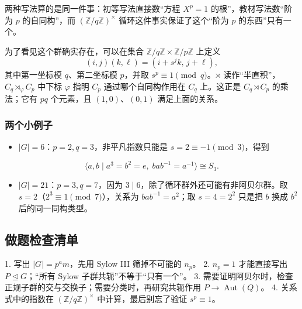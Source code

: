 两种写法算的是同一件事：初等写法直接数“方程 $X^p=1$ 的根”，教材写法数“阶为 $p$ 的自同构”，而 $(\mathbb Z/q\mathbb Z)^\times$ 循环这件事实保证了这个“阶为 $p$ 的东西”只有一个。

为了看见这个群确实存在，可以在集合 $\mathbb Z/q\mathbb Z\times\mathbb Z/p\mathbb Z$ 上定义
\[
(i,j)(k,\ell)=(i+s^j k,\,j+\ell),
\]
其中第一坐标模 $q$、第二坐标模 $p$，并取 $s^p\equiv1\pmod q$。$\rtimes$ 读作“半直积”，$C_q\rtimes_\varphi C_p$ 中下标 $\varphi$ 指明 $C_p$ 通过哪个自同构作用在 $C_q$ 上。这正是 $C_q\rtimes C_p$ 的乘法；它有 $pq$ 个元素，且 $(1,0)$、$(0,1)$ 满足上面的关系。

\subsubsection{两个小例子}


\begin{itemize}
\item $|G|=6$：$p=2,q=3$，非平凡指数只能是 $s=2\equiv-1\pmod3$，得到
\end{itemize}

\[
  \langle a,b\mid a^3=b^2=e,\;bab^{-1}=a^{-1}\rangle\cong S_3.
\]
\begin{itemize}
\item $|G|=21$：$p=3,q=7$，因为 $3\mid6$，除了循环群外还可能有非阿贝尔群。取 $s=2$（$2^3\equiv1\pmod7$），关系为 $bab^{-1}=a^2$；取 $s=4=2^2$ 只是把 $b$ 换成 $b^2$ 后的同一同构类型。
\end{itemize}


\subsection{做题检查清单}


1. 写出 $|G|=p^a m$，先用 Sylow III 筛掉不可能的 $n_p$。
2. $n_p=1$ 才能直接写出 $P\trianglelefteq G$；“所有 Sylow 子群共轭”不等于“只有一个”。
3. 需要证明阿贝尔时，检查正规子群的交与交换子；需要分类时，再研究共轭作用 $P\to\operatorname{Aut}(Q)$。
4. 关系式中的指数在 $(\mathbb Z/q\mathbb Z)^\times$ 中计算，最后别忘了验证 $s^p\equiv1$。
